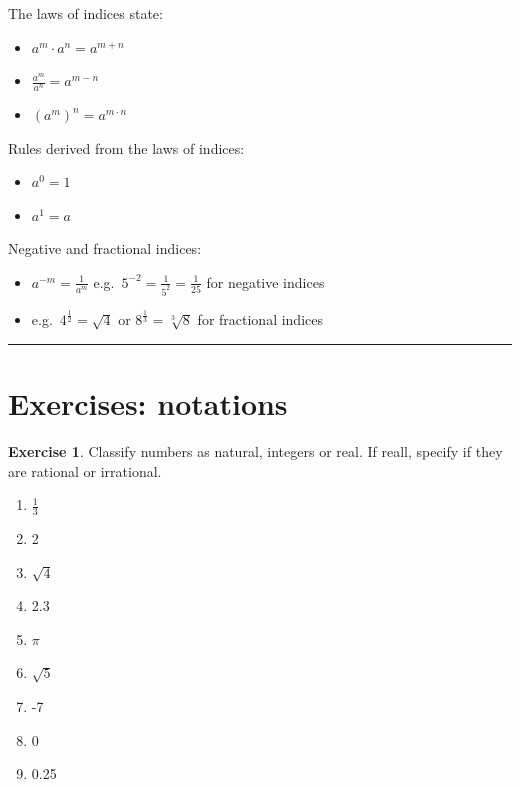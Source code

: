 \documentclass[
]{book}
\providecommand{\tightlist}{%
  \setlength{\itemsep}{0pt}\setlength{\parskip}{0pt}}
\theoremstyle{definition}
\theoremstyle{definition}
\theoremstyle{definition}
\newtheorem{exercise}{Exercise}[chapter]
\theoremstyle{remark}
\begin{document}
The laws of indices state:

\begin{itemize}
\tightlist
\item
  \(a^m \cdot a^n = a^{m+n}\)
\item
  \(\frac{a^m}{a^n} = a^{m-n}\)
\item
  \((a^m)^n = a^{m\cdot n}\)
\end{itemize}

Rules derived from the laws of indices:

\begin{itemize}
\tightlist
\item
  \(a^0 = 1\)
\item
  \(a^1 = a\)
\end{itemize}

Negative and fractional indices:

\begin{itemize}
\tightlist
\item
  \(a^{-m} = \frac{1}{a^m}\) e.g.~\(5^{-2} = \frac{1}{5^2} = \frac{1}{25}\) for negative indices
\item
  e.g.~\(4^{\frac{1}{2}} = \sqrt{4}\) or \(8^{\frac{1}{3}} = \sqrt[3]{8}\) for fractional indices
\end{itemize}

\begin{center}\rule{0.5\linewidth}{0.5pt}\end{center}

\hypertarget{exercises-notations}{%
\section{Exercises: notations}\label{exercises-notations}}

\begin{exercise}
\protect\hypertarget{exr:m-notations-numbers}{}{\label{exr:m-notations-numbers} }
Classify numbers as natural, integers or real. If reall, specify if they are rational or irrational.

\begin{enumerate}
\def\labelenumi{\alph{enumi})}
\tightlist
\item
  \(\frac{1}{3}\)
\item
  2
\item
  \(\sqrt{4}\)
\item
  2.3
\item
  \(\pi\)
\item
  \(\sqrt{5}\)
\item
  -7
\item
  0
\item
  0.25
\end{enumerate}
\end{exercise}
\end{document}
